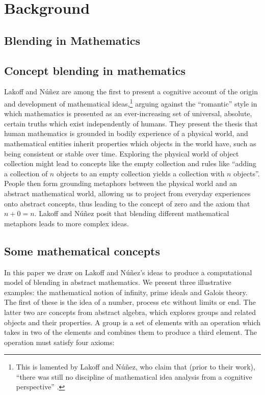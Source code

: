 \section{Background}
\label{sec:background}

\subsection{Blending in Mathematics}
\label{subsec:mathblend}

\subsection{Concept blending in mathematics}
Lakoff and N{\'u}{\~n}ez \citep{Lak00} are among the first to present
a cognitive account of the origin and development of mathematical
ideas,\footnote{This is lamented by Lakoff and N{\'u}{\~n}ez, who
claim that (prior to their work), ``there was still no discipline of
mathematical idea analysis from a cognitive perspective''
\citep{Lak00}.} arguing against the ``romantic'' style in which
mathematics is presented as an ever-increasing set of universal,
absolute, certain truths which exist independently of humans. They
present the thesis that human mathematics is grounded in bodily
experience of a physical world, and mathematical entities inherit
properties which objects in the world have, such as being consistent
or stable over time.  Exploring the physical world of object
collection might lead to concepts like the empty collection and rules
like ``adding a collection of $n$ objects to an empty collection
yields a collection with $n$ objects''. People then form grounding
metaphors between the physical world and an abstract mathematical
world, allowing us to project from everyday experiences onto abstract
concepts, thus leading to the concept of zero and the axiom that $n +
0 = n$. Lakoff and N{\'u}{\~n}ez posit that blending different
mathematical metaphors leads to more complex ideas. 

\subsection{Some mathematical concepts}
In this paper we draw on Lakoff and N{\'u}{\~n}ez's ideas to produce a
computational model of blending in abstract mathematics. We present
three illustrative examples: the mathematical notion of infinity,
prime ideals and Galois theory. The first of these is the idea of a
number, process etc without limits or end. The latter two are concepts
from abstract algebra, which explores groups and related objects and
their properties. A group is a set of elements with an operation which
takes in two of the elements and combines them to produce a third
element. The operation must satisfy four axioms:

